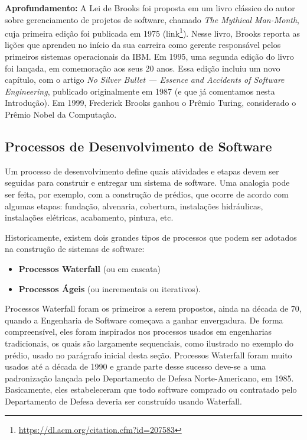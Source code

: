 \documentclass[
  11pt,
  twoside]{book}
\DeclareRobustCommand{\href}[2]{#2\footnote{\url{#1}}}
\newenvironment{esmbox}{\centering \vspace{1.5ex} \begin{tcolorbox}[breakable, colback=backcolor, width=4.9in]}{\end{tcolorbox} \vspace{1.5ex}}
\begin{document}
\begin{esmbox}

\textbf{Aprofundamento:} A Lei de Brooks foi proposta em um livro
clássico do autor sobre gerenciamento de projetos de software, chamado
\emph{The Mythical Man-Month}, cuja primeira edição foi publicada em
1975 (\href{https://dl.acm.org/citation.cfm?id=207583}{link}). Nesse
livro, Brooks reporta as lições que aprendeu no início da sua carreira
como gerente responsável pelos primeiros sistemas operacionais da IBM.
Em 1995, uma segunda edição do livro foi lançada, em comemoração aos
seus 20 anos. Essa edição incluiu um novo capítulo, com o artigo
\emph{No Silver Bullet --- Essence and Accidents of Software
Engineering}, publicado originalmente em 1987 (e que já comentamos nesta
Introdução). Em 1999, Frederick Brooks ganhou o Prêmio Turing,
considerado o Prêmio Nobel da Computação.

\end{esmbox}

\hypertarget{processos-de-desenvolvimento-de-software}{%
\subsection{Processos de Desenvolvimento de
Software}\label{processos-de-desenvolvimento-de-software}}

 Um processo de desenvolvimento define
quais atividades e etapas devem ser seguidas para construir e entregar
um sistema de software. Uma analogia pode ser feita, por exemplo, com a
construção de prédios, que ocorre de acordo com algumas etapas:
fundação, alvenaria, cobertura, instalações hidráulicas, instalações
elétricas, acabamento, pintura, etc.

Historicamente, existem dois grandes tipos de processos que podem ser
adotados na construção de sistemas de software:

\begin{itemize}
\item
  \textbf{Processos Waterfall} (ou em cascata)
\item
  \textbf{Processos Ágeis} (ou incrementais ou iterativos).
\end{itemize}

 Processos Waterfall foram os primeiros a serem
propostos, ainda na década de 70, quando a Engenharia de Software
começava a ganhar envergadura. De forma compreensível, eles foram
inspirados nos processos usados em engenharias tradicionais, os quais
são largamente sequenciais, como ilustrado no exemplo do prédio, usado
no parágrafo inicial desta seção. Processos Waterfall foram muito usados
até a década de 1990 e grande parte desse sucesso deve-se a uma
padronização lançada pelo Departamento de Defesa Norte-Americano, em
1985. Basicamente, eles estabeleceram que todo software comprado ou
contratado pelo Departamento de Defesa deveria ser construído usando
Waterfall.
\end{document}
